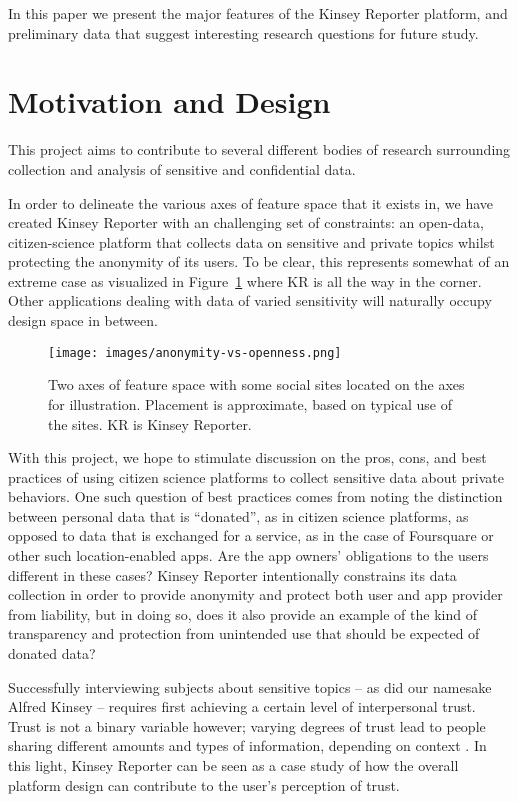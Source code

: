 \documentclass{sigchi}
\begin{document}
In this paper we present the major features of the Kinsey Reporter platform, and preliminary data that suggest interesting research questions for future study.

\section{Motivation and Design}
This project aims to contribute to several different bodies of research surrounding collection and analysis of sensitive and confidential data.

In order to delineate the various axes of feature space that it exists in, we have created Kinsey Reporter with an challenging set of constraints: an open-data, citizen-science platform that collects data on sensitive and private topics whilst protecting the anonymity of its users. To be clear, this represents somewhat of an extreme case as visualized in Figure~\ref{fig:anonymity-vs-openness} where KR is all the way in the corner. Other applications dealing with data of varied sensitivity will naturally occupy design space in between.

\begin{figure}
\texttt{[image: images/anonymity-vs-openness.png]}
\caption{Two axes of feature space with some social sites located on the axes for illustration. Placement is approximate, based on typical use of the sites. KR is Kinsey Reporter.}
\label{fig:anonymity-vs-openness}
\end{figure}

With this project, we hope to stimulate discussion on the pros, cons, and best practices of using citizen science platforms to collect sensitive data about private behaviors.
One such question of best practices comes from noting the distinction between personal data that is ``donated'', as in citizen science platforms, as opposed to data that is exchanged for a service, as in the case of Foursquare or other such location-enabled apps.
Are the app owners' obligations to the users different in these cases? 
Kinsey Reporter intentionally constrains its data collection in order to provide anonymity and protect both user and app provider from liability, but in doing so, does it also provide an example of the kind of transparency and protection from unintended use that should be expected of donated data?

Successfully interviewing subjects about sensitive topics -- as did our namesake Alfred Kinsey -- requires first achieving a certain level of interpersonal trust.
Trust is not a binary variable however; varying degrees of trust lead to people sharing different amounts and types of information, depending on context \cite{Anthony2007}.
In this light, Kinsey Reporter can be seen as a case study of how the overall platform design can contribute to the user's perception of trust.
\end{document}
